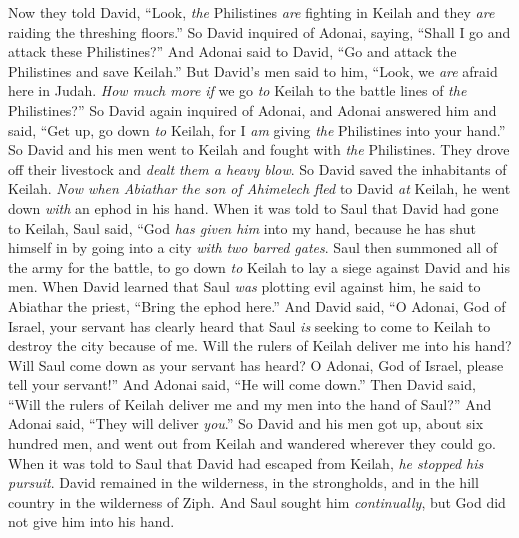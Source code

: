 \begin{biblechapter} %
 Now they told David, “Look, \textit{the} Philistines \textit{are} fighting in Keilah and they \textit{are} raiding the threshing floors.”
\verse So David inquired of Adonai, saying, “Shall I go and attack these Philistines?” And Adonai said to David, “Go and attack the Philistines and save Keilah.”
\verse But David’s men said to him, “Look, we \textit{are} afraid here in Judah. \textit{How much more} \textit{if} we go \textit{to} Keilah to the battle lines of \textit{the} Philistines?”
\verse So David again inquired of Adonai, and Adonai answered him and said, “Get up, go down \textit{to} Keilah, for I \textit{am} giving \textit{the} Philistines into your hand.”
\verse So David and his men went to Keilah and fought with \textit{the} Philistines. They drove off their livestock and \textit{dealt them a heavy blow}. So David saved the inhabitants of Keilah.
 \textit{Now when Abiathar the son of Ahimelech fled} to David \textit{at} Keilah, he went down \textit{with} an ephod in his hand.
\verse When it was told to Saul that David had gone to Keilah, Saul said, “God \textit{has given him} into my hand, because he has shut himself in by going into a city \textit{with} \textit{two barred gates}.
\verse Saul then summoned all of the army for the battle, to go down \textit{to} Keilah to lay a siege against David and his men.
\verse When David learned that Saul \textit{was} plotting evil against him, he said to Abiathar the priest, “Bring the ephod here.”
\verse And David said, “O Adonai, God of Israel, your servant has clearly heard that Saul \textit{is} seeking to come to Keilah to destroy the city because of me.
\verse Will the rulers of Keilah deliver me into his hand? Will Saul come down as your servant has heard? O Adonai, God of Israel, please tell your servant!” And Adonai said, “He will come down.”
\verse Then David said, “Will the rulers of Keilah deliver me and my men into the hand of Saul?” And Adonai said, “They will deliver \textit{you}.”
\verse So David and his men got up, about six hundred men, and went out from Keilah and wandered wherever they could go. When it was told to Saul that David had escaped from Keilah, \textit{he stopped his pursuit}.
 David remained in the wilderness, in the strongholds, and in the hill country in the wilderness of Ziph. And Saul sought him \textit{continually}, but God did not give him into his hand.

\end{biblechapter}
